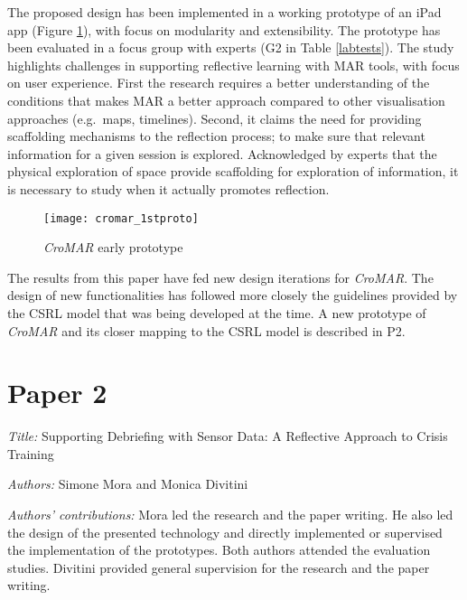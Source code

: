 The proposed design has been implemented in a working prototype of an iPad app (Figure \ref{fig:cromar-prototype}), with focus on modularity and extensibility. The prototype has been evaluated in a focus group with experts (G2 in Table \ref{labtests}). The study highlights challenges in supporting reflective learning with MAR tools, with focus on user experience. First the research requires a better understanding of the conditions that makes MAR a better approach compared to other visualisation approaches (e.g.~maps, timelines). Second, it claims the need for providing scaffolding mechanisms to the reflection process; to make sure that relevant information for a given session is explored. Acknowledged by experts that the physical exploration of space provide scaffolding for exploration of information, it is necessary to study when it actually promotes reflection. 

\begin{figure}
	[tbh] \centering 
	\texttt{[image: cromar\_1stproto]} \caption{\emph{CroMAR} early prototype} \label{fig:cromar-prototype} 
\end{figure}


The results from this paper have fed new design iterations for \emph{CroMAR}. The design of new functionalities has followed more closely the guidelines provided by the CSRL model that was being developed at the time. A new prototype of \emph{CroMAR} and its closer mapping to the CSRL model is described in P2.


\section[P2: Supporting Debriefing with Sensor Data: A Reflective Approach to Crisis Training][Paper 2]{Paper 2}\label{paper-2}

\emph{Title:} Supporting Debriefing with Sensor Data: A Reflective Approach to Crisis Training

\emph{Authors:} Simone Mora and Monica Divitini

\emph{Authors' contributions:} Mora led the research and the paper writing. He also led the design of the presented technology and directly implemented or supervised the implementation of the prototypes. Both authors attended the evaluation studies. Divitini provided general supervision for the research and the paper writing.

